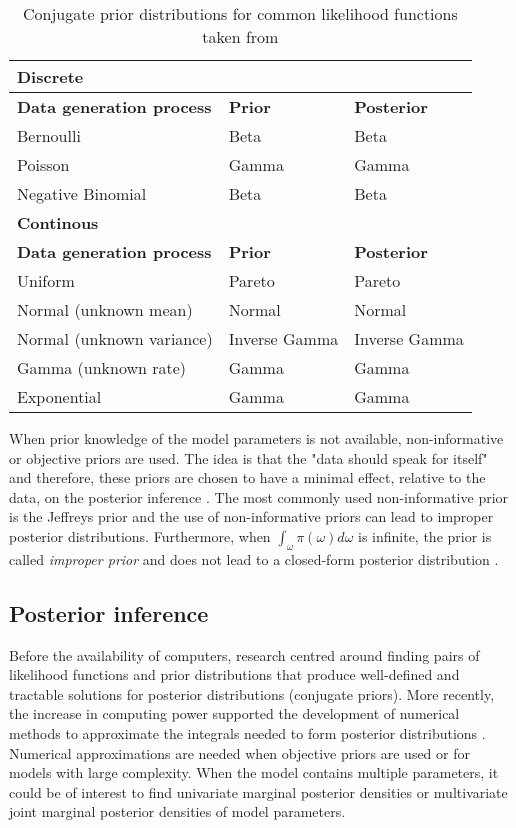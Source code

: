 \begin{table}[hb	]
\centering
\caption{Conjugate prior distributions for common likelihood functions taken from \citep{Fink1997}}
\label{tab0:priors}
\begin{tabular}{l l l}
\toprule
\textbf{Discrete} & &\\
\midrule
\midrule
\textbf{Data generation process} & \textbf{Prior} & \textbf{Posterior} \\ 
\midrule 
Bernoulli & Beta & Beta \\
Poisson & Gamma  & Gamma \\
Negative Binomial & Beta & Beta \\
\midrule
\midrule
\textbf{Continous} & & \\
\midrule
\midrule
\textbf{Data generation process} & \textbf{Prior} & \textbf{Posterior} \\ 
\midrule
Uniform  & Pareto & Pareto \\ 
Normal (unknown mean) &  Normal  & Normal \\ 
Normal (unknown variance) &  Inverse Gamma  & Inverse Gamma \\ 
Gamma (unknown rate) &  Gamma  & Gamma \\ 
Exponential &  Gamma  & Gamma \\ 
\bottomrule
\end{tabular}
\end{table} 

When prior knowledge of the model parameters is not available, non-informative or objective priors are used. The idea is that the "data should speak for itself" and therefore, these priors are chosen to have a minimal effect, relative to the data, on the posterior inference \citep{Bernardo2000}. The most commonly used non-informative prior is the Jeffreys prior \citep{Jeffreys1946} and the use of non-informative priors can lead to improper posterior distributions. Furthermore, when $\int_\omega\pi(\omega)d\omega$ is infinite, the prior is called \emph{improper prior} and does not lead to a closed-form posterior distribution \citep{Bernardo2003}.

\subsection{Posterior inference} \label{sec0:posterior_inference}

Before the availability of computers, research centred around finding pairs of likelihood functions and prior distributions that produce well-defined and tractable solutions for posterior distributions (conjugate priors). More recently, the increase in computing power supported the development of numerical methods to approximate the integrals needed to form posterior distributions \citep{Fink1997}. Numerical approximations are needed when objective priors are used or for models with large complexity. When the model contains multiple parameters, it could be of interest to find univariate marginal posterior densities or multivariate joint marginal posterior densities of model parameters.\\


